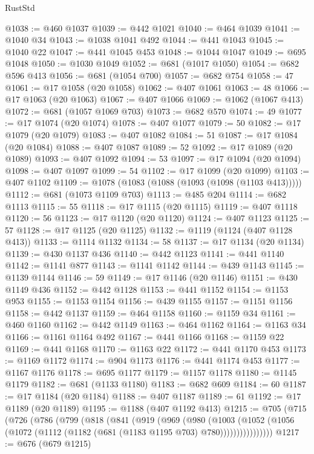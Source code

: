 \begin{lexlean}{RustStd}
\begin{coremodule}
@1038 := @460 @1037
@1039 := @442 @1021
@1040 := @464 @1039
@1041 := @1040 @34
@1043 := @1038 @1041 @492
@1044 := @441 @1043
@1045 := @1040 @22
@1047 := @441 @1045 @453
@1048 := @1044 @1047
@1049 := @695 @1048
@1050 := @1030 @1049
@1052 := @681 (@1017 @1050)
@1054 := @682 @596 @413
@1056 := @681 (@1054 @700)
@1057 := @682 @754
@1058 := 47
@1061 := @17 @1058 (@20 @1058)
@1062 := @407 @1061
@1063 := 48
@1066 := @17 @1063 (@20 @1063)
@1067 := @407 @1066
@1069 := @1062 (@1067 @413)
@1072 := @681 (@1057 @1069 @703)
@1073 := @682 @570
@1074 := 49
@1077 := @17 @1074 (@20 @1074)
@1078 := @407 @1077
@1079 := 50
@1082 := @17 @1079 (@20 @1079)
@1083 := @407 @1082
@1084 := 51
@1087 := @17 @1084 (@20 @1084)
@1088 := @407 @1087
@1089 := 52
@1092 := @17 @1089 (@20 @1089)
@1093 := @407 @1092
@1094 := 53
@1097 := @17 @1094 (@20 @1094)
@1098 := @407 @1097
@1099 := 54
@1102 := @17 @1099 (@20 @1099)
@1103 := @407 @1102
@1109 := @1078 (@1083 (@1088 (@1093 (@1098 (@1103 @413)))))
@1112 := @681 (@1073 @1109 @703)
@1113 := @485 @204
@1114 := @682 @1113
@1115 := 55
@1118 := @17 @1115 (@20 @1115)
@1119 := @407 @1118
@1120 := 56
@1123 := @17 @1120 (@20 @1120)
@1124 := @407 @1123
@1125 := 57
@1128 := @17 @1125 (@20 @1125)
@1132 := @1119 (@1124 (@407 @1128 @413))
@1133 := @1114 @1132
@1134 := 58
@1137 := @17 @1134 (@20 @1134)
@1139 := @430 @1137 @436
@1140 := @442 @1123
@1141 := @441 @1140
@1142 := @1141 @877
@1143 := @1141 @1142
@1144 := @439 @1143
@1145 := @1139 @1144
@1146 := 59
@1149 := @17 @1146 (@20 @1146)
@1151 := @430 @1149 @436
@1152 := @442 @1128
@1153 := @441 @1152
@1154 := @1153 @953
@1155 := @1153 @1154
@1156 := @439 @1155
@1157 := @1151 @1156
@1158 := @442 @1137
@1159 := @464 @1158
@1160 := @1159 @34
@1161 := @460 @1160
@1162 := @442 @1149
@1163 := @464 @1162
@1164 := @1163 @34
@1166 := @1161 @1164 @492
@1167 := @441 @1166
@1168 := @1159 @22
@1169 := @441 @1168
@1170 := @1163 @22
@1172 := @441 @1170 @453
@1173 := @1169 @1172
@1174 := @904 @1173
@1176 := @441 @1174 @453
@1177 := @1167 @1176
@1178 := @695 @1177
@1179 := @1157 @1178
@1180 := @1145 @1179
@1182 := @681 (@1133 @1180)
@1183 := @682 @609
@1184 := 60
@1187 := @17 @1184 (@20 @1184)
@1188 := @407 @1187
@1189 := 61
@1192 := @17 @1189 (@20 @1189)
@1195 := @1188 (@407 @1192 @413)
@1215 := @705
    (@715
      (@726
        (@786
          (@799
            (@818
              (@841
                (@919
                  (@969
                    (@980
                      (@1003
                        (@1052
                          (@1056 (@1072 (@1112 (@1182 (@681 (@1183 @1195 @703) @780))))))))))))))))
@1217 := @676 (@679 @1215)

\end{coremodule}
\end{lexlean}
